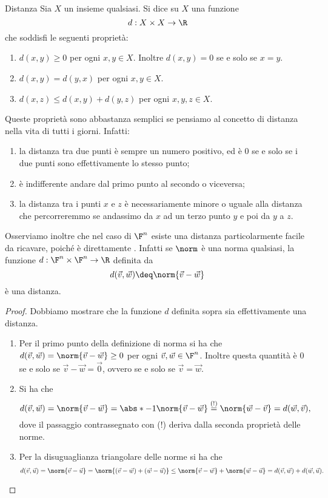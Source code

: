\begin{definition}
    {Distanza}{}
    Sia $X$ un insieme qualsiasi. Si dice  su $X$ una funzione \[
        d : X \times X \to \R
    \] che soddisfi le seguenti proprietà:
    \begin{enumerate}[(1)]
        \item $d(x, y) \geq 0$ per ogni $x, y \in X$. Inoltre $d(x, y) = 0$ se e solo se $x = y$.
        \item $d(x, y) = d(y, x)$ per ogni $x, y \in X$.
        \item $d(x, z) \leq d(x, y) + d(y, z)$ per ogni $x, y, z \in X$.  
    \end{enumerate}
\end{definition}

Queste proprietà sono abbastanza semplici se pensiamo al concetto di distanza nella vita di tutti i giorni. Infatti:
\begin{enumerate}[(1)]
    \item la distanza tra due punti è sempre un numero positivo, ed è $0$ se e solo se i due punti sono effettivamente lo stesso punto;
    \item è indifferente andare dal primo punto al secondo o viceversa;
    \item la distanza tra i punti $x$ e $z$ è necessariamente minore o uguale alla distanza che percorreremmo se andassimo da $x$ ad un terzo punto $y$ e poi da $y$ a $z$.
\end{enumerate}

Osserviamo inoltre che nel caso di $\F^n$ esiste una distanza particolarmente facile da ricavare, poiché è direttamente . Infatti se $\norm$ è una norma qualsiasi, la funzione $d : \F^n \times \F^n \to \R$ definita da \[
    d(\vec v, \vec w) \deq \norm{\vec v - \vec w}
\] è una distanza.
\begin{proof}
    Dobbiamo mostrare che la funzione $d$ definita sopra sia effettivamente una distanza.
    \begin{enumerate}[(1)]
        \item Per il primo punto della definizione di norma si ha che $d(\vec v, \vec w) = \norm{\vec v - \vec w} \geq 0$ per ogni $\vec v, \vec w \in \F^n$. Inoltre questa quantità è $0$ se e solo se $\vec v - \vec w = \vec 0$, ovvero se e solo se $\vec v = \vec w$.
        \item Si ha che \[
            d(\vec v, \vec w)
            = \norm{\vec v - \vec w}
            = \abs*{-1}\norm{\vec v - \vec w}
            \stackrel{(!)}{=} \norm{\vec w - \vec v}
            = d(\vec w, \vec v),
        \] dove il passaggio contrassegnato con (!) deriva dalla seconda proprietà delle norme.
        \item Per la disuguaglianza triangolare delle norme si ha che \[
            d(\vec v, \vec u)
            = \norm{\vec v - \vec u}
            = \norm{(\vec v - \vec w) + (\vec w - \vec u)}
            \leq \norm{\vec v - \vec w} + \norm{\vec w - \vec u}
            = d(\vec v, \vec w) + d(\vec w, \vec u). \qedhere
        \]
    \end{enumerate}
\end{proof}

